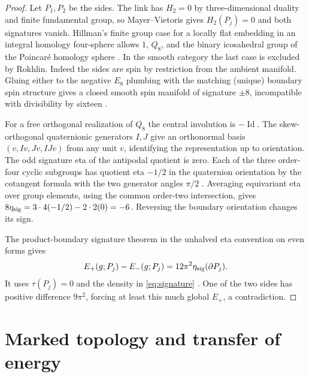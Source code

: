 \documentclass[11pt]{article}
\numberwithin{equation}{section}
\theoremstyle{definition}
\theoremstyle{remark}
\newcommand{\Id}{\operatorname{Id}}
\begin{document}
\begin{proof}
Let \(P_1,P_2\) be the sides. The link has \(H_2=0\) by
three-dimensional duality and finite fundamental group, so
Mayer--Vietoris gives \(H_2(P_j)=0\) and both signatures vanish.
Hillman's finite group case for a locally flat embedding in an
integral homology four-sphere allows \(1\), \(Q_8\), and the
binary icosahedral group of the Poincaré homology sphere
\cite[Theorem 5.2(1) and Corollary 4.4.2]{Hillman2024LocallyFlat}.
In the smooth category the last case is excluded by Rokhlin.
Indeed the sides are spin by restriction from the ambient
manifold. Gluing either to the negative \(E_8\) plumbing with
the matching (unique) boundary spin structure gives a closed
smooth spin manifold of signature \(\pm8\), incompatible
with divisibility by sixteen
\cite[Descriptions (1) and (4)]{KirbyScharlemann1979Poincare}%
\cite[\S1.2]{Rokhlin1971Submanifolds}.

For a free orthogonal realization of \(Q_8\) the central
involution is \(-\Id\). The skew-orthogonal quaternionic generators
\(I,J\) give an orthonormal basis \((v,Iv,Jv,IJv)\) from any unit
\(v\), identifying the representation up to orientation.
The odd signature eta of the antipodal quotient is zero.
Each of the three order-four cyclic subgroups has quotient eta
\(-1/2\) in the quaternion orientation by the cotangent formula
with the two generator angles \(\pi/2\)
\cite[Proposition (2.12)]{APS1975SpectralII}. Averaging equivariant
eta over group elements, using the common order-two intersection,
gives \(8\eta_{\rm sig}=3\cdot 4(-1/2)-2\cdot 2(0)=-6\).
Reversing the boundary orientation changes its sign.

The product-boundary signature theorem in the unhalved eta
convention on even forms gives
\[
 E_+(g;P_j)-E_-(g;P_j)=12\pi^2\eta_{\rm sig}(\partial P_j).
\]
It uses \(\tau(P_j)=0\) and the density in \eqref{eq:signature}
\cite[Theorem (4.14)]{APS1975SpectralI}. One of the two sides has
positive difference \(9\pi^2\), forcing at least this much
global \(E_+\), a contradiction.
\end{proof}

\section{Marked topology and transfer of energy}
\end{document}
